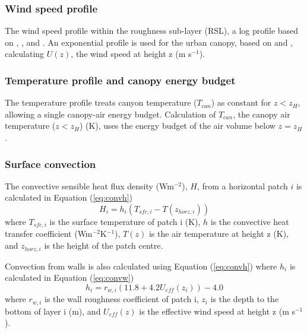 \documentclass[final,3p,times,authoryear]{elsarticle}
\begin{document}
\subsubsection{Wind speed profile}\label{sec:windspeedprofile}
The wind speed profile within the roughness sub-layer (RSL), a log profile based on \cite{Masson2000}, \cite{Kusaka2001}, and \cite{Harman2004}. An exponential profile is used for the urban canopy, based on \cite{Masson2000} and \cite{Rotach1995}, calculating $U(z)$, the wind speed at height z (m s$^{-1}$).


\subsubsection{Temperature profile and canopy energy budget}\label{sec:tempprof}
The temperature profile treats canyon temperature ($T_{can}$) as constant for $z < z_{H}$, allowing a single canopy-air energy budget. Calculation of $T_{can}$, the canopy air temperature ($z < z_{H}$) (K), uses the energy budget of the air volume below $z = z_{H}$. 


\subsubsection{Surface convection}

The convective sensible heat flux density (Wm$^{-2}$), $H$, from a horizontal patch $i$ is calculated in Equation (\ref{eq:convh})
\begin{equation} 
H_{i} = h_{i} (T_{sfc,i}-T(z_{horz,i}))
\label{eq:convh} \end{equation} 
where $T_{sfc,i}$ is the surface temperature of patch i (K),
$h$ is the convective heat transfer coefficient (Wm$^{-2}$K$^{-1}$), 
$T(z)$ is the air temperature at height z (K), and 
$z_{horz,i}$ is the height of the patch centre.


Convection from walls is also calculated using Equation (\ref{eq:convh}) where $h_{i}$ is calculated in Equation (\ref{eq:convw})
\begin{equation} 
h_{i} = r_{w,i}(11.8+4.2 U_{eff}(z_{i}))-4.0
\label{eq:convw} \end{equation} 
where 
$r_{w,i}$ is the wall roughness coefficient of patch i,
$z_{i}$ is the depth to the bottom of layer i (m), and
$U_{eff}(z)$ is the effective wind speed at height z (m s$^{-1}$).
\end{document}
